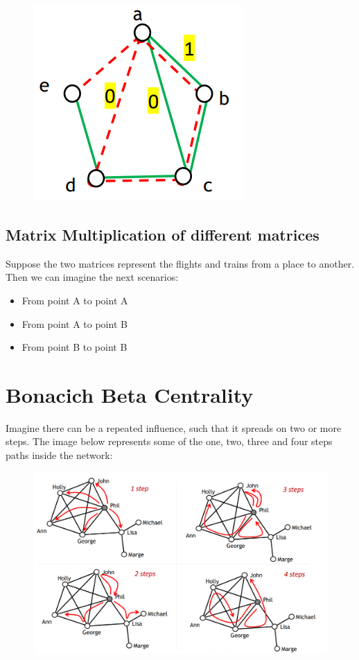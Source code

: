 \documentclass[
  notitlepage,
  onecolumn,
  openany]{book}
\providecommand{\tightlist}{%
  \setlength{\itemsep}{0pt}\setlength{\parskip}{0pt}}
\begin{document}
\begin{figure}[h!]

{\centering \includegraphics[width=0.3\linewidth]{images/05-Matrices and Beta centrality/Untitled 2} 

}

\end{figure}

\hypertarget{matrix-multiplication-of-different-matrices}{%
\subsection{Matrix Multiplication of different matrices}\label{matrix-multiplication-of-different-matrices}}

Suppose the two matrices represent the flights and trains from a place to another. Then we can imagine the next scenarios:

\begin{itemize}
\tightlist
\item
  From point A to point A
\item
  From point A to point B
\item
  From point B to point B
\end{itemize}

\hypertarget{bonacich-beta-centrality-1}{%
\section{Bonacich Beta Centrality}\label{bonacich-beta-centrality-1}}

Imagine there can be a repeated influence, such that it spreads on two or more steps. The image below represents some of the one, two, three and four steps paths inside the network:

\begin{figure}[h!]

{\centering \includegraphics[width=0.6\linewidth]{images/05-Matrices and Beta centrality/Untitled 3} 

}

\end{figure}
\end{document}
